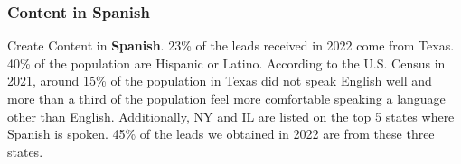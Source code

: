 \documentclass[
]{article}
\begin{document}
\hypertarget{content-in-spanish}{%
\subsubsection{Content in Spanish}\label{content-in-spanish}}

Create Content in \textbf{Spanish}. 23\% of the leads received in 2022
come from Texas. 40\% of the population are Hispanic or Latino.
According to the U.S. Census in 2021, around 15\% of the population in
Texas did not speak English well and more than a third of the population
feel more comfortable speaking a language other than English.
Additionally, NY and IL are listed on the top 5 states where Spanish is
spoken. 45\% of the leads we obtained in 2022 are from these three
states.
\end{document}
